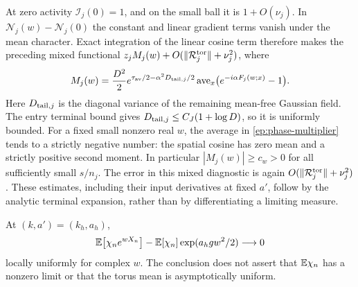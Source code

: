 At zero activity $\mathcal I_j(0)=1$, and on the small ball it is
$1+O(\nu_j)$.  In $\mathcal N_j(w)-\mathcal N_j(0)$ the constant
and linear gradient terms vanish under the mean character.  Exact
integration of the linear cosine term therefore makes the preceding
mixed functional
$z_jM_j(w)+O(\|\mathcal R_j^{\rm tor}\|+\nu_j^2)$, where
\begin{equation}\label{ep:phase-multiplier}
 M_j(w)=\frac{D^2}{2}
 e^{\tau_{\rm av}/2-\alpha^2 D_{{\rm tail},j}/2}
 \operatorname{ave}_x\bigl(e^{-i\alpha F_j(w;x)}-1\bigr).
\end{equation}
Here $D_{{\rm tail},j}$ is the diagonal variance of the remaining
mean-free Gaussian field.  The entry terminal bound gives
$D_{{\rm tail},j}\le C_J(1+\log D)$, so it is uniformly bounded.
For a fixed
small nonzero real $w$, the average in
\eqref{ep:phase-multiplier} tends to a strictly negative number:
the spatial cosine has zero mean and a strictly positive second
moment.  In particular $|M_j(w)|\ge c_w>0$ for all sufficiently
small $s/n_j$.  The error in this mixed diagnostic is
again $O(\|\mathcal R_j^{\rm tor}\|+\nu_j^2)$.
These estimates, including their input derivatives at fixed $a'$,
follow by the analytic terminal expansion, rather than by
differentiating a limiting measure.

\begin{lemma}
\label{ep:phase-factorization}
At $(k,a')=(k_h,a_h)$,
\[
 \mathbb E\bigl[\chi_n e^{wX_n}\bigr]
 -\mathbb E[\chi_n]\exp(a_hgw^2/2)\longrightarrow0
\]
locally uniformly for complex $w$.  The conclusion does not assert
that $\mathbb E\chi_n$ has a nonzero limit or that the torus mean is
asymptotically uniform.
\end{lemma}

